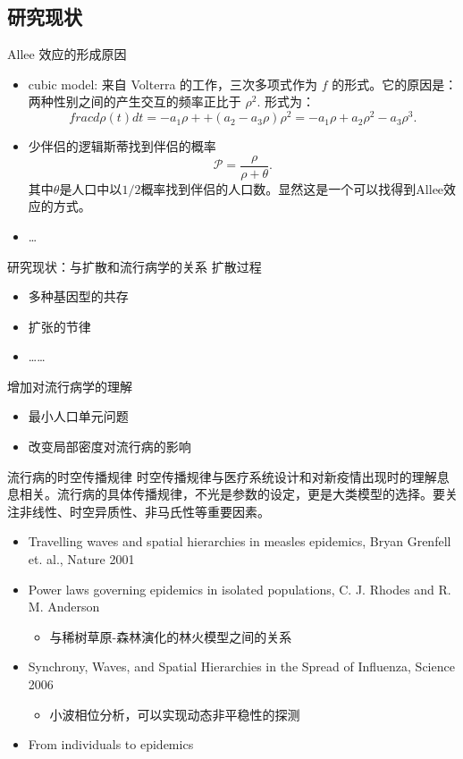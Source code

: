 \subsection{研究现状}

\begin{frame}{Allee 效应的形成原因}
    \begin{itemize}
        \item cubic model: 来自 Volterra 的工作，三次多项式作为 $f$ 的形式。它的原因是：两种性别之间的产生交互的频率正比于 $\rho^2$. 形式为：\[frac{d\rho(t)}{dt} = -a_1\rho + +(a_2-a_3\rho)\rho^2 = -a_1\rho + a_2\rho^2 - a_3\rho^3.\]
        \item 少伴侣的逻辑斯蒂找到伴侣的概率\[\mathcal{P} = \frac{\rho}{\rho +\theta}.\]其中$\theta$是人口中以$1/2$概率找到伴侣的人口数。显然这是一个可以找得到Allee效应的方式。
        \item \dots
    \end{itemize}
\end{frame}

\begin{frame}{研究现状：与扩散和流行病学的关系}
扩散过程
    \begin{itemize}
        \item 多种基因型的共存
        \item 扩张的节律
        \item ……
    \end{itemize}
增加对流行病学的理解
\begin{itemize}
    \item 最小人口单元问题
    \item 改变局部密度对流行病的影响
\end{itemize}
\end{frame}

\begin{frame}{流行病的时空传播规律}
    时空传播规律与医疗系统设计和对新疫情出现时的理解息息相关。流行病的具体传播规律，不光是参数的设定，更是大类模型的选择。要关注非线性、时空异质性、非马氏性等重要因素。
    \begin{itemize}
        \item Travelling waves and spatial hierarchies in measles epidemics, Bryan Grenfell et. al., Nature 2001
        \item Power laws governing epidemics in isolated populations, C. J. Rhodes and R. M. Anderson
        \begin{itemize}
            \item 与稀树草原-森林演化的林火模型之间的关系
        \end{itemize}
        \item Synchrony, Waves, and Spatial Hierarchies in the Spread of Influenza, Science 2006
        \begin{itemize}
            \item 小波相位分析，可以实现动态非平稳性的探测
        \end{itemize}
        \item From individuals to epidemics
    \end{itemize}
\end{frame}

